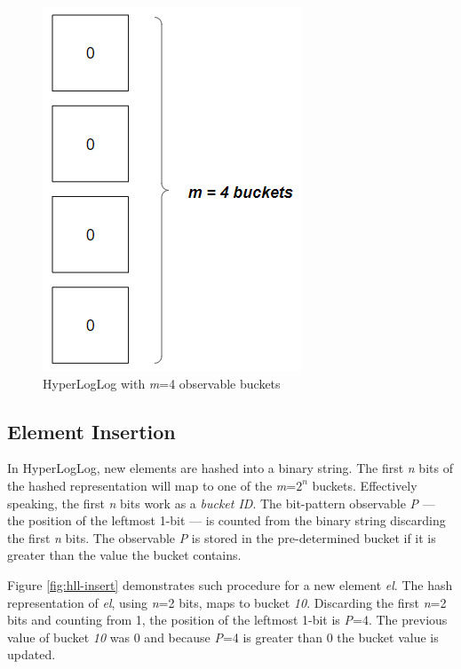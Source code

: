 \begin{figure}[!htb]
    \begin{center}
      \includegraphics[scale=0.6]{figures/hll-ds.png}
      \caption[HyperLogLog initial state]{HyperLogLog with \textit{m}=4 observable buckets}
      \label{fig:hll-ds}
    \end{center}
\end{figure}


\subsection*{Element Insertion}
In HyperLogLog, new elements are hashed into a binary string. The first \textit{n} bits of the hashed representation will map to one of the \textit{m}=$2^n$ buckets. Effectively speaking, the first \textit{n} bits work as a \textit{bucket ID}. The bit-pattern observable \textit{P} --- the position of the leftmost 1-bit --- is counted from the binary string discarding the first \textit{n} bits. The observable \textit{P} is stored in the pre-determined bucket if it is greater than the value the bucket contains. 

Figure \ref{fig:hll-insert} demonstrates such procedure for a new element \textit{el}. The hash representation of \textit{el}, using \textit{n}=2 bits, maps to bucket \textit{10}. Discarding the first \textit{n}=2 bits and counting from 1, the position of the leftmost 1-bit is \textit{P}=4. The previous value of bucket \textit{10} was 0 and because \textit{P}=4 is greater than 0 the bucket value is updated.


